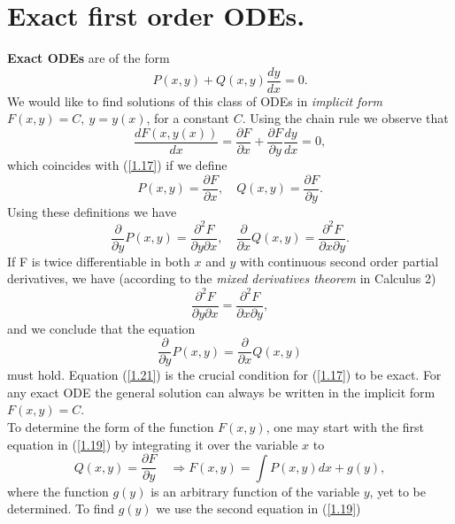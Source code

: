 \documentclass[11pt,a4paper,twoside]{article}
\begin{document}
	\section{Exact first order ODEs.}
	\textbf{Exact ODEs} are of the form
	\begin{equation}\label{1.17}
		P(x, y) + Q(x, y)\frac{dy}{dx} = 0.
	\end{equation}
	We would like to find solutions of this class of ODEs in \textit{implicit form} $F(x, y) = C,\ y = y(x)$, for a constant $C$. Using the chain rule we observe that
	\begin{equation}\label{1.18}
		\frac{dF(x, y(x))}{dx}
		= \frac{\partial F}{\partial x} + \frac{\partial F}{\partial y}\frac{dy}{dx}
		= 0,
	\end{equation}
	which coincides with (\ref{1.17}) if we define
	\begin{equation}\label{1.19}
		P(x,y) = \frac{\partial F}{\partial x}, \quad
		Q(x,y) = \frac{\partial F}{\partial y}.
	\end{equation}
	Using these definitions we have
	\begin{equation}\label{1.20}
		\frac{\partial}{\partial y}P(x,y) = \frac{\partial^2F}{\partial y\partial x}, \quad
		\frac{\partial}{\partial x}Q(x,y) = \frac{\partial^2F}{\partial x\partial y}.
	\end{equation}
	If F is twice differentiable in both $x$ and $y$ with continuous second order partial derivatives, we have (according to the \textit{mixed derivatives theorem} in Calculus 2)
	$$
		\frac{\partial^2 F}{\partial y \partial x} = \frac{\partial^2 F}{\partial x \partial y},
	$$
	and we conclude that the equation
	\begin{equation}\label{1.21}
		\frac{\partial }{\partial y}P(x,y) = \frac{\partial}{\partial x}Q(x,y)
	\end{equation}
	must hold. Equation (\ref{1.21}) is the crucial condition for (\ref{1.17}) to be exact. For any exact ODE the general solution can always be written in the implicit form $F(x, y) = C$.\\
	To determine the form of the function $F(x, y)$, one may start with the first equation in (\ref{1.19}) by integrating it over the variable $x$ to
	\begin{equation}\label{1.22}
		Q(x,y)
		= \frac{\partial F}{\partial y}\quad \Rightarrow
		F(x,y)
		= \int P(x,y)dx + g(y), 
	\end{equation}
	where the function $g(y)$ is an arbitrary function of the variable $y$, yet to be determined. To find $g(y)$ we use the second equation in (\ref{1.19})
\end{document}
